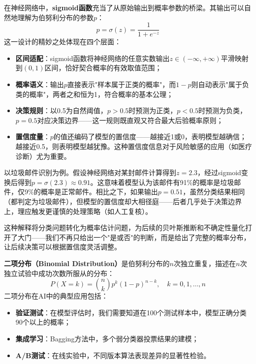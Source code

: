 在神经网络中，\textbf{sigmoid函数}充当了从原始输出到概率参数的桥梁。其输出可以自然地理解为伯努利分布的参数$p$：
\begin{equation}
p = \sigma(z) = \frac{1}{1+e^{-z}}
\end{equation}
这一设计的精妙之处体现在四个层面：

\begin{itemize}
  \item \textbf{区间适配}：sigmoid函数将神经网络的任意实数输出$z \in (-\infty, +\infty)$平滑映射到$(0,1)$区间，恰好契合概率的有效取值范围；

  \item \textbf{概率语义}：输出$p$直接表示"样本属于正类的概率"，而$1-p$则自动表示"属于负类的概率"，两者之和恒为1，符合概率的基本公理；

  \item \textbf{决策规则}：以0.5为自然阈值，$p > 0.5$时预测为正类，$p < 0.5$时预测为负类，$p = 0.5$对应决策边界——这一规则既直观又符合最大后验概率原则；

  \item \textbf{置信度量}：$p$的值还编码了模型的置信度——越接近1或0，表明模型越确信；越接近0.5，则表明模型越犹豫。这种置信度信息对于风险敏感的应用（如医疗诊断）尤为重要。
\end{itemize}

以垃圾邮件识别为例。假设神经网络对某封邮件计算得到$z = 2.3$，经过sigmoid变换后得到$p = \sigma(2.3) \approx 0.91$。这意味着模型认为该邮件有91\%的概率是垃圾邮件，仅9\%的概率是正常邮件。相比之下，如果输出$p = 0.51$，虽然分类结果相同（都判定为垃圾邮件），但模型的置信度却大相径庭——后者几乎处于决策边界上，理应触发更谨慎的处理策略（如人工复核）。

这种解释将分类问题转化为概率估计问题，为后续的贝叶斯推断和不确定性量化打开了大门——我们不再只给出一个"是或否"的判断，而是给出了完整的概率分布，让后续决策可以根据置信度灵活调整。

\textbf{二项分布（Binomial Distribution）}是伯努利分布的$n$次独立重复，描述在$n$次独立试验中成功次数所服从的分布：
\begin{equation}
P(X=k) = \binom{n}{k}p^k(1-p)^{n-k}, \quad k = 0, 1, \ldots, n
\end{equation}
二项分布在AI中的典型应用包括：
\begin{itemize}
  \item \textbf{验证测试}：在模型评估时，我们需要知道在100个测试样本中，模型正确分类90个以上的概率；
  \item \textbf{集成学习}：Bagging方法中，多个弱分类器投票结果的建模；
  \item \textbf{A/B测试}：在线实验中，不同版本算法表现差异的显著性检验。
\end{itemize}


